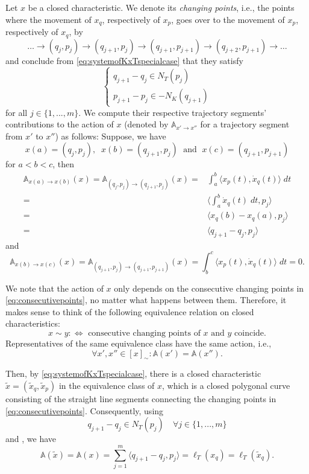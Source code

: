 \documentclass[12pt]{amsart}
\theoremstyle{plain}
\theoremstyle{remark}
\theoremstyle{definition}
\newcommand{\A}{\mathbb{A}}
\def\beq{\begin{equation}}\def\eeq{\end{equation}}
\def\beqq{\begin{equation*}}\def\eeqq{\end{equation*}}
\begin{document}
Let $x$ be a closed characteristic. We denote its \textit{changing points}, i.e., the points where the movement of $x_q$, respectively of $x_p$, goes over to the movement of $x_p$, respectively of $x_q$, by
\beq \dots \rightarrow (q_j,p_j) \rightarrow (q_{j+1},p_j) \rightarrow (q_{j+1},p_{j+1})\rightarrow (q_{j+2},p_{j+1}) \rightarrow \dots \label{eq:consecutivepoints}\eeq
and conclude from \eqref{eq:systemofKxTspecialcase} that they satisfy
\beqq \begin{cases} q_{j+1}-q_j\in N_T(p_j)\\ p_{j+1}-p_j\in -N_K(q_{j+1})\end{cases}\eeqq
for all $j\in\{1,...,m\}$. We compute their respective trajectory segments' contributions to the action of $x$ (denoted by $\A_{x'\rightarrow x''}$ for a trajectory segment from $x'$ to $x''$) as follows: Suppose, we have
\beqq x(a)=(q_{j},p_{j}),\;\; x(b)=(q_{j+1},p_j)\; \text{ and } \; x(c)=(q_{j+1},p_{j+1})\eeqq
for $a<b<c$, then
\begin{align*}
\A_{x(a)\rightarrow x(b)}(x)=\A_{(q_j,p_j)\rightarrow (q_{j+1},p_j)}(x)=& \int_a^b \langle x_p(t),\dot{x}_q(t)\rangle\;dt\\
=& \langle \int_a^b \dot{x}_q(t)\;dt,p_j\rangle \\
=&\langle x_q(b)-x_q(a),p_j\rangle \\
=&\langle q_{j+1}-q_j,p_j\rangle
\end{align*}
and
\beqq \A_{x(b)\rightarrow x(c)}(x)=\A_{(q_{j+1},p_j)\rightarrow (q_{j+1},p_{j+1})}(x)=\int_b^c \langle x_p(t),\dot{x}_q(t)\rangle\;dt =0.\eeqq

We note that the action of $x$ only depends on the consecutive changing points in \eqref{eq:consecutivepoints}, no matter what happens between them. Therefore, it makes sense to think of the following equivalence relation on closed characteristics:
\beqq x \sim y :\Leftrightarrow \text{ consecutive changing points of } x \text{ and }y\text{ coincide}.\eeqq
Representatives of the same equivalence class have the same action, i.e.,
\beqq \forall x',x''\in[x]_\sim: \A(x')=\A(x'').\eeqq

Then, by \eqref{eq:systemofKxTspecialcase}, there is a closed characteristic $\widetilde{x}=(\widetilde{x}_q,\widetilde{x}_p)$ in the equivalence class of $x$, which is a closed polygonal curve consisting of the straight line segments connecting the changing points in \eqref{eq:consecutivepoints}. Consequently, using
\beqq q_{j+1}-q_j\in N_T(p_j) \quad \forall j\in\{1,...,m\}\eeqq
and \cite[Proposition 2.2]{KruppRudolf2022}, we have
\beqq \A(\widetilde{x})=\A(x)=\sum_{j=1}^m \langle q_{j+1}-q_j,p_j\rangle=\ell_T(x_q)=\ell_T(\widetilde{x}_q).\eeqq
\end{document}
